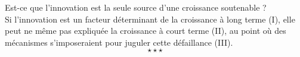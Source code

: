 	\hspace*{.5cm}Est-ce que l'innovation est la seule source d'une croissance soutenable ?\\
	
	\hspace*{.5cm}Si l'innovation est un facteur déterminant de la croissance à long terme (I), elle peut ne même pas expliquée la croissance à court terme (II), au point où des mécanismes s'imposeraient pour juguler cette défaillance (III). $$\star \star \star$$


